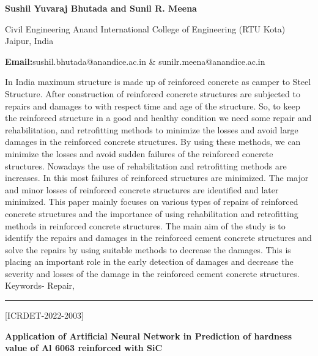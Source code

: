 \documentclass[twoside,11pt]{amsart}
\begin{document}
\centerline{\textbf{Sushil Yuvaraj Bhutada and Sunil R. Meena }}
\vskip 5mm
\begin{flushleft}
Civil Engineering Anand International College of Engineering (RTU Kota) Jaipur, India
\vskip 5mm
\end{flushleft}
\vskip 2mm
\begin{flushleft}
{\bf Email:}sushil.bhutada@anandice.ac.in \& sunilr.meena@anandice.ac.in
\end{flushleft}
\vskip 5mm
In India maximum structure is made up of reinforced concrete as camper to Steel Structure. After construction of reinforced concrete structures are subjected to repairs and damages to with respect time and age of the structure. So, to keep the reinforced structure in a good and healthy condition we need some repair and rehabilitation, and retrofitting methods to minimize the losses and avoid large damages in the reinforced concrete structures. By using these methods, we can minimize the losses and avoid sudden failures of the reinforced concrete structures. Nowadays the use of rehabilitation and retrofitting methods are increases. In this most failures of reinforced structures are minimized. The major and minor losses of reinforced concrete structures are identified and later minimized. This paper mainly focuses on various types of repairs of reinforced concrete structures and the importance of using rehabilitation and retrofitting methods in reinforced concrete structures. The main aim of the study is to identify the repairs and damages in the reinforced cement concrete structures and solve the repairs by using suitable methods to decrease the damages. This is placing an important role in the early detection of damages and decrease the severity and losses of the damage in the reinforced cement concrete structures.
Keywords- Repair,
\vskip 2mm
\rule{\textwidth}{0.5pt}


\vskip 5mm
\begin{flushleft}
\centerline{[ICRDET-2022-2003]}
\end{flushleft}
\begin{center}\bf\LARGE
Application of Artificial Neural Network in Prediction of hardness value of Al 6063 reinforced with SiC
\end{center}
\vskip 5mm
\end{document}

